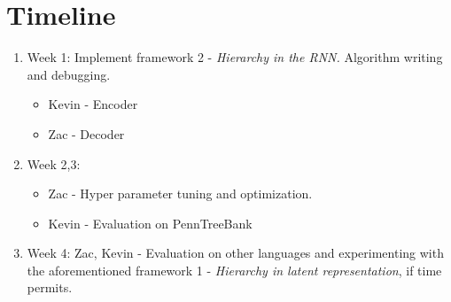 \documentclass[journal, 12pt, draftcls, onecolumn]{IEEEtran}
\begin{document}
\section{Timeline} \label{timeline}
\begin{enumerate}
    \item Week 1: Implement framework 2 - \emph{Hierarchy in the RNN.} Algorithm writing and debugging. 
    \begin{itemize}
        \item Kevin - Encoder 
        \item Zac - Decoder 
    \end{itemize}
    \item Week 2,3: 
    \begin{itemize}
        \item Zac - Hyper parameter tuning and optimization.
        \item Kevin - Evaluation on PennTreeBank 
    \end{itemize}
    \item Week 4: Zac, Kevin - Evaluation on other languages and experimenting with the aforementioned framework 1 - \emph{Hierarchy in latent representation}, if time permits.  
\end{enumerate}
\end{document}
